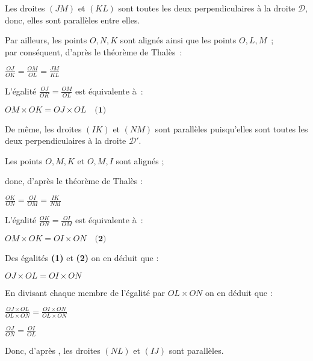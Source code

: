 \begin{corrige}
     Les droites $ \left( JM \right) $ et $ \left( KL \right) $ sont toutes les deux perpendiculaires à la droite $\mathscr{D} $, donc, elles sont parallèles entre elles.
     \par
     Par ailleurs, les points $ O, N, K $ sont alignés ainsi que les points $ O, L, M $~;
     \\
     par conséquent, d'après le théorème de Thalès~:
     \begin{center}
          $ \frac{ OJ }{ OK } = \frac{ OM }{ OL } = \frac{ JM }{ KL } $
     \end{center}
     L'égalité $ \frac{ OJ }{ OK } = \frac{ OM }{ OL } $ est équivalente à~:
     \begin{center}
          $ OM \times OK = OJ \times OL \quad \textbf{(1)} $
     \end{center}
\medskip
De même, les droites $  \left( IK \right)   $ et $  \left( NM \right)   $ sont parallèles puisqu'elles sont toutes les deux perpendiculaires à la droite $\mathscr{D'} $.
\par
Les points $ O, M, K $ et $ O, M, I $ sont alignés ;
\par
donc, d'après le théorème de Thalès :   
     \begin{center}
          $ \frac{ OK }{ ON } = \frac{ OI }{ OM } = \frac{ IK }{ NM } $
     \end{center}
 L'égalité $ \frac{ OK }{ ON } = \frac{ OI }{ OM } $ est équivalente à~:
     \begin{center}
          $ OM \times OK = OI \times ON \quad \textbf{(2)} $
     \end{center}
\medskip
Des égalités  \textbf{(1) } et  \textbf{(2)}  on en déduit que :
     \begin{center}
         $ OJ \times OL = OI \times ON  $
     \end{center}
En divisant chaque membre de l'égalité par $ OL  \times ON  $ on en déduit que :
\par
$ \frac{ OJ  \times OL  }{ OL  \times ON  } = \frac{ OI  \times ON  }{ OL  \times ON  }    $ 
\par
$ \frac{ OJ }{ ON } = \frac{ OI }{ OL }    $ 
\par
Donc, d'après , les droites $  \left( NL \right)   $ et $  \left( IJ \right)   $ sont parallèles.   
\end{corrige}
